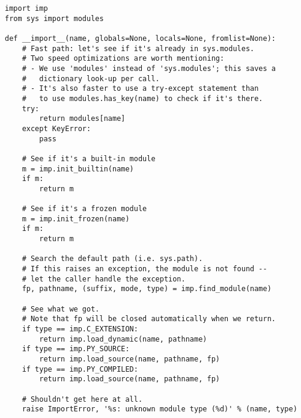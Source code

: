 \begin{verbatim}
import imp
from sys import modules

def __import__(name, globals=None, locals=None, fromlist=None):
    # Fast path: let's see if it's already in sys.modules.
    # Two speed optimizations are worth mentioning:
    # - We use 'modules' instead of 'sys.modules'; this saves a
    #   dictionary look-up per call.
    # - It's also faster to use a try-except statement than
    #   to use modules.has_key(name) to check if it's there.
    try:
        return modules[name]
    except KeyError:
        pass

    # See if it's a built-in module
    m = imp.init_builtin(name)
    if m:
        return m

    # See if it's a frozen module
    m = imp.init_frozen(name)
    if m:
        return m

    # Search the default path (i.e. sys.path).
    # If this raises an exception, the module is not found --
    # let the caller handle the exception.
    fp, pathname, (suffix, mode, type) = imp.find_module(name)

    # See what we got.
    # Note that fp will be closed automatically when we return.
    if type == imp.C_EXTENSION:
        return imp.load_dynamic(name, pathname)
    if type == imp.PY_SOURCE:
        return imp.load_source(name, pathname, fp)
    if type == imp.PY_COMPILED:
        return imp.load_source(name, pathname, fp)

    # Shouldn't get here at all.
    raise ImportError, '%s: unknown module type (%d)' % (name, type)
\end{verbatim}
